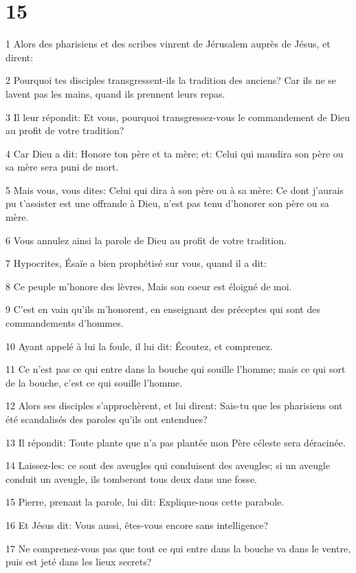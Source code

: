\chapter{15}

\par 1 Alors des pharisiens et des scribes vinrent de Jérusalem auprès de Jésus, et dirent:
\par 2 Pourquoi tes disciples transgressent-ils la tradition des anciens? Car ils ne se lavent pas les mains, quand ils prennent leurs repas.
\par 3 Il leur répondit: Et vous, pourquoi transgressez-vous le commandement de Dieu au profit de votre tradition?
\par 4 Car Dieu a dit: Honore ton père et ta mère; et: Celui qui maudira son père ou sa mère sera puni de mort.
\par 5 Mais vous, vous dites: Celui qui dira à son père ou à sa mère: Ce dont j'aurais pu t'assister est une offrande à Dieu, n'est pas tenu d'honorer son père ou sa mère.
\par 6 Vous annulez ainsi la parole de Dieu au profit de votre tradition.
\par 7 Hypocrites, Ésaïe a bien prophétisé sur vous, quand il a dit:
\par 8 Ce peuple m'honore des lèvres, Mais son coeur est éloigné de moi.
\par 9 C'est en vain qu'ils m'honorent, en enseignant des préceptes qui sont des commandements d'hommes.
\par 10 Ayant appelé à lui la foule, il lui dit: Écoutez, et comprenez.
\par 11 Ce n'est pas ce qui entre dans la bouche qui souille l'homme; mais ce qui sort de la bouche, c'est ce qui souille l'homme.
\par 12 Alors ses disciples s'approchèrent, et lui dirent: Sais-tu que les pharisiens ont été scandalisés des paroles qu'ils ont entendues?
\par 13 Il répondit: Toute plante que n'a pas plantée mon Père céleste sera déracinée.
\par 14 Laissez-les: ce sont des aveugles qui conduisent des aveugles; si un aveugle conduit un aveugle, ils tomberont tous deux dans une fosse.
\par 15 Pierre, prenant la parole, lui dit: Explique-nous cette parabole.
\par 16 Et Jésus dit: Vous aussi, êtes-vous encore sans intelligence?
\par 17 Ne comprenez-vous pas que tout ce qui entre dans la bouche va dans le ventre, puis est jeté dans les lieux secrets?
